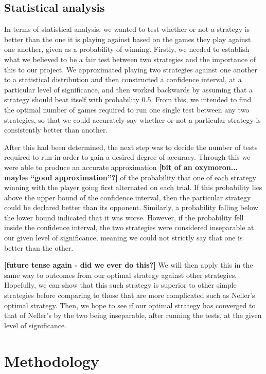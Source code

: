 \documentclass[a4paper,titlepage]{article}
\begin{document}
\subsection{Statistical analysis}
In terms of statistical analysis, we wanted to test whether or not a strategy is better than the one it is playing against based on the games they play against one another, given as a probability of winning. Firstly, we needed to establish what we believed to be a fair test between two strategies and the importance of this to our project. We approximated playing two strategies against one another to a statistical distribution and then constructed a confidence interval, at a particular level of significance, and then worked backwards by assuming that a strategy should beat itself with probability $0.5$. From this, we intended to find the optimal number of games required to run one single test between any two strategies, so that we could accurately say whether or not a particular strategy is consistently better than another.

After this had been determined, the next step was to decide the number of tests required to run in order to gain a desired degree of accuracy. Through this we were able to produce an accurate approximation \textbf{[bit of an oxymoron... maybe ``good approximation''?]} of the probability that one of each strategy winning with the player going first alternated on each trial. If this probability lies above the upper bound of the confidence interval, then the particular strategy could be declared better than its opponent. Similarly, a probability falling below the lower bound indicated that it was worse. However, if the probability fell inside the confidence interval, the two strategies were considered inseparable at our given level of significance, meaning we could not strictly say that one is better than the other.

\textbf{[future tense again - did we ever do this?]} We will then apply this in the same way to outcomes from our optimal strategy against other strategies. Hopefully, we can show that this such strategy is superior to other simple strategies before comparing to those that are more complicated such as Neller’s optimal strategy. Then, we hope to see if our optimal strategy has converged to that of Neller’s by the two being inseparable, after running the tests, at the given level of significance.

\section{Methodology}
\end{document}
